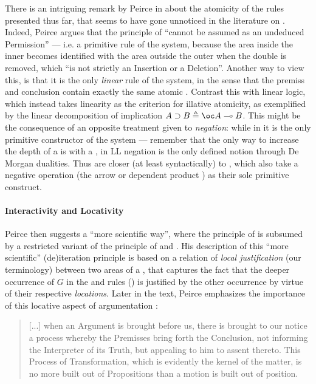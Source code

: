 \begin{scope}
\begin{scope}
There is an intriguing remark by Peirce in
\cite[pp.~536--537]{peirce_prolegomena_1906} about the atomicity of the rules
presented thus far, that seems to have gone unnoticed in the literature on .
Indeed, Peirce argues that the principle of  ``cannot be
assumed as an undeduced Permission'' --- i.e. a primitive rule of the system,
because the area inside the inner  becomes identified with the area outside
the outer  when the double  is removed, which ``is not strictly an
Insertion or a Deletion''. Another way to view this, is that it is the only
\emph{linear} rule of the system, in the sense that the premiss and conclusion
contain exactly the same atomic . Contrast this with linear logic, which
instead takes linearity as the criterion for illative atomicity, as exemplified
by the linear decomposition of implication $A \limp B \defeq \oc A \multimap B$.
This might be the consequence of an opposite treatment given to \emph{negation}:
while in  it is the only primitive constructor of the system --- remember that
the only way to increase the depth of a  is with a , in LL negation is
the only defined notion through De Morgan dualities. Thus  are closer (at
least syntactically) to \emph{}, which also take a negative
operation (the arrow or dependent product ) as their sole primitive
construct.

\paragraph{Interactivity and Locativity}

Peirce then suggests a ``more scientific way'', where the principle of
 is subsumed by a restricted variant of the principle of
 and . His description of this ``more
scientific'' (de)iteration principle is based on a relation of \emph{local
justification} (our terminology) between two areas of a , that captures the
fact that the deeper occurrence of $G$ in the  and  rules
() is justified by the other occurrence by virtue of their
respective \emph{locations}. Later in the text, Peirce emphasizes the importance
of this locative aspect of argumentation
\cite[pp.~544--545]{peirce_prolegomena_1906}:

\begin{quote}
  [...] when an Argument is brought before us, there is brought to our notice a
process whereby the Premisses bring forth the Conclusion, not informing the
Interpreter of its Truth, but appealing to him to assent thereto. This Process
of Transformation, which is evidently the kernel of the matter, is no more built
out of Propositions than a motion is built out of position.
\end{quote}


\end{scope}
\end{scope}
